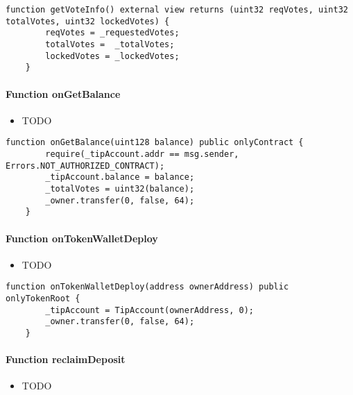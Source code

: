 \begin{lstlisting}[firstnumber=218]
    function getVoteInfo() external view returns (uint32 reqVotes, uint32 totalVotes, uint32 lockedVotes) {
        reqVotes = _requestedVotes;
        totalVotes =  _totalVotes;
        lockedVotes = _lockedVotes;
    }
\end{lstlisting}

\paragraph{Function onGetBalance}

\begin{itemize}
\item TODO
\end{itemize}

\begin{lstlisting}[firstnumber=181]
    function onGetBalance(uint128 balance) public onlyContract {
        require(_tipAccount.addr == msg.sender, Errors.NOT_AUTHORIZED_CONTRACT);
        _tipAccount.balance = balance;
        _totalVotes = uint32(balance);
        _owner.transfer(0, false, 64);
    }
\end{lstlisting}

\paragraph{Function onTokenWalletDeploy}

\begin{itemize}
\item TODO
\end{itemize}

\begin{lstlisting}[firstnumber=192]
    function onTokenWalletDeploy(address ownerAddress) public onlyTokenRoot {
        _tipAccount = TipAccount(ownerAddress, 0);
        _owner.transfer(0, false, 64);
    }
\end{lstlisting}

\paragraph{Function reclaimDeposit}

\begin{itemize}
\item TODO
\end{itemize}

